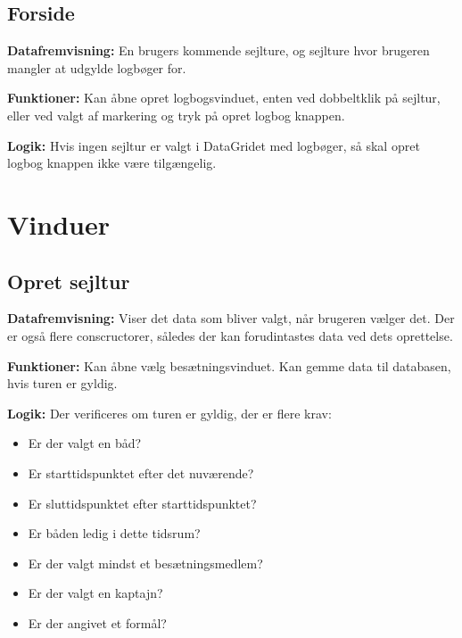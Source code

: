 \subsection{Forside}


\textbf{Datafremvisning:} 
En brugers kommende sejlture, og sejlture hvor brugeren mangler at udgylde logbøger for.

\textbf{Funktioner:} 
Kan åbne opret logbogsvinduet, enten ved dobbeltklik på sejltur, eller ved valgt af markering og tryk på opret logbog knappen. 

\textbf{Logik:} 
Hvis ingen sejltur er valgt i DataGridet med logbøger, så skal opret logbog knappen ikke være tilgængelig.



\section{Vinduer}
\subsection{Opret sejltur}

\textbf{Datafremvisning:} 
Viser det data som bliver valgt, når brugeren vælger det. 
Der er også flere conscructorer, således der kan forudintastes data ved dets oprettelse.

\textbf{Funktioner:} 
Kan åbne vælg besætningsvinduet. 
Kan gemme data til databasen, hvis turen er gyldig.

\textbf{Logik:} 
Der verificeres om turen er gyldig, der er flere krav:
\begin{itemize}
    \item Er der valgt en båd?
    \item Er starttidspunktet efter det nuværende?
    \item Er sluttidspunktet efter starttidspunktet?
    \item Er båden ledig i dette tidsrum?
    \item Er der valgt mindst et besætningsmedlem?
    \item Er der valgt en kaptajn?
    \item Er der angivet et formål?
\end{itemize}


